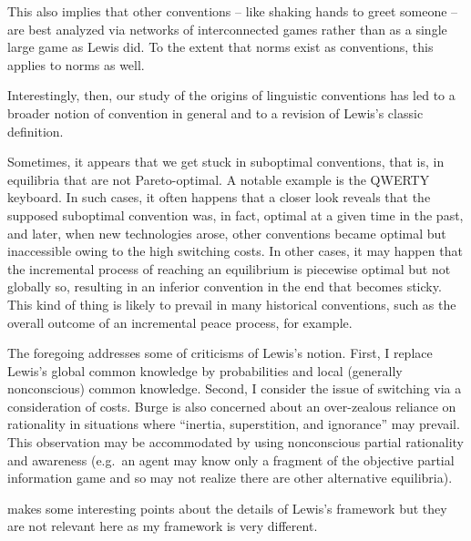 This also implies that other conventions -- like shaking hands to greet someone -- are best analyzed via networks of interconnected games rather than as a single large game as Lewis did. To the extent that norms exist as conventions, this applies to norms as well.

Interestingly, then, our study of the origins of linguistic conventions has led to a broader notion of convention in general and to a revision of Lewis's classic definition.

Sometimes, it appears that we get stuck in suboptimal conventions, that is, in equilibria that are not Pareto-optimal. A notable example is the QWERTY keyboard. In such cases, it often happens that a closer look reveals that the supposed suboptimal convention was, in fact, optimal at a given time in the past, and later, when new technologies arose, other conventions became optimal but inaccessible owing to the high switching costs. In other cases, it may happen that the incremental process of reaching an equilibrium is piecewise optimal but not globally so, resulting in an inferior convention in the end that becomes sticky. This kind of thing is likely to prevail in many historical conventions, such as the overall outcome of an incremental peace process, for example.

The foregoing addresses some of  criticisms of Lewis's notion. First, I replace Lewis's global common knowledge by probabilities and local (generally nonconscious) common knowledge. Second, I consider the issue of switching via a consideration of costs. Burge is also concerned about an over-zealous reliance on rationality in situations where ``inertia, superstition, and ignorance'' may prevail. This observation may be accommodated by using nonconscious partial rationality and awareness (e.g.\ an agent may know only a fragment of the objective partial information game and so may not realize there are other alternative equilibria).

\citet{gilbert:gtc} makes some interesting points about the details of Lewis's framework but they are not relevant here as my framework is very different.








